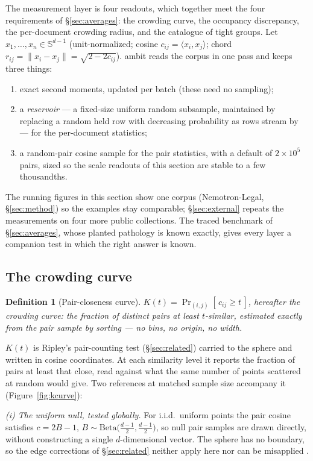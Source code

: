 \documentclass[11pt,letterpaper]{article}
\newtheorem{definition}{Definition}
\newcommand{\sphere}{\mathbb{S}^{d-1}}
\begin{document}
The measurement layer is four readouts, which together meet the four
requirements of \S\ref{sec:averages}: the crowding curve, the occupancy
discrepancy, the per-document crowding radius, and the catalogue of tight
groups. Let $x_1,\dots,x_n \in \sphere$ (unit-normalized; cosine $c_{ij} =
\langle x_i,x_j\rangle$; chord $r_{ij} = \lVert x_i - x_j\rVert = \sqrt{2
- 2 c_{ij}}$). \textsf{ambit} reads the corpus in one pass and keeps three things:
\begin{enumerate}
\item exact second moments, updated per batch (these need no sampling);
\item a \emph{reservoir} --- a fixed-size uniform random subsample,
  maintained by replacing a random held row with decreasing probability
  as rows stream by --- for the per-document statistics;
\item a random-pair cosine sample for the pair statistics, with a
  default of $2{\times}10^5$ pairs, sized so the scale readouts of this
  section are stable to a few thousandths.
\end{enumerate}
The running figures in this section show one corpus (Nemotron-Legal,
\S\ref{sec:method}) so the examples stay comparable;
\S\ref{sec:external} repeats the measurements on four more public
collections. The traced
benchmark of \S\ref{sec:averages}, whose planted pathology is known
exactly, gives every layer a companion test in which the right answer is
known.

\subsection{The crowding curve}
\label{sec:kcurve}

\begin{definition}[Pair-closeness curve]
$K(t) = \Pr_{(i,j)}[\, c_{ij} \ge t \,]$, hereafter the crowding curve:
the fraction of distinct pairs at least $t$-similar, estimated
\emph{exactly} from the pair sample by sorting --- no bins, no origin, no
width.
\end{definition}

$K(t)$ is Ripley's pair-counting test (\S\ref{sec:related}) carried to the
sphere \cite{ripley1976} and written in cosine coordinates. At each
similarity level it reports the fraction of pairs at least that close,
read against what the same number of points scattered at random would
give. Two references at
matched sample size accompany it (Figure~\ref{fig:kcurve}):

\emph{(i) The uniform null, tested globally.} For i.i.d.\ uniform points
the pair cosine satisfies $c = 2B - 1$, $B \sim
\mathrm{Beta}\!\big(\tfrac{d-1}{2},\tfrac{d-1}{2}\big)$, so null pair
samples are drawn directly, without constructing a single $d$-dimensional
vector. The sphere has no boundary, so the edge corrections of
\S\ref{sec:related} neither apply here nor can be misapplied
\cite{robeson2014}.
\end{document}
